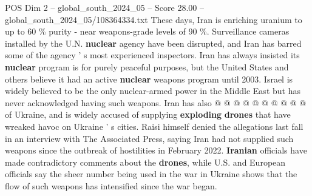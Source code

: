 \begin{textsample}{POS Dim 2 – global\_south\_2024\_05 – Score 28.00 – global\_south\_2024\_05/108364334.txt}
These days, Iran is enriching uranium to up to 60 \% purity - near weapons-grade levels of 90 \%.
Surveillance cameras installed by the U.N. \textbf{nuclear} agency have been disrupted, and Iran has barred some of the agency ' s most experienced inspectors.
Iran has always insisted its \textbf{nuclear} program is for purely peaceful purposes, but the United States and others believe it had an active \textbf{nuclear} weapons program until 2003.
Israel is widely believed to be the only nuclear-armed power in the Middle East but has never acknowledged having such weapons.
Iran has also @ @ @ @ @ @ @ @ @ @ of Ukraine, and is widely accused of supplying \textbf{exploding} \textbf{drones} that have wreaked havoc on Ukraine ' s cities.
Raisi himself denied the allegations last fall in an interview with The Associated Press, saying Iran had not supplied such weapons since the outbreak of hostilities in February 2022. \textbf{Iranian} officials have made contradictory comments about the \textbf{drones}, while U.S. and European officials say the sheer number being used in the war in Ukraine shows that the flow of such weapons has intensified since the war began.

\end{textsample}

